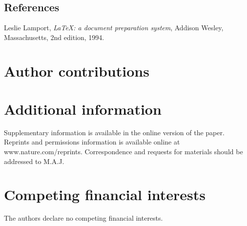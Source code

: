 \documentclass[twocolumn, linenumbers, superscriptaddress]{revtex4-1}
\begin{document}
	\begin{thebibliography}{50}
		\section*{References}	
			Leslie Lamport,
			\textit{\LaTeX: a document preparation system},
			Addison Wesley, Massachusetts,
			2nd edition,
			1994.

	\end{thebibliography}

	\begin{acknowledgements}

	\end{acknowledgements}

	\section*{Author contributions}
	
	\section*{Additional information}
		Supplementary information is available in the online version of the paper.
		Reprints and permissions information is available online at www.nature.com/reprints.
		Correspondence and requests for materials should be addressed to M.A.J.
	
	\section*{Competing financial interests}
		The authors declare no competing financial interests.
	
	\newpage

\end{document}
